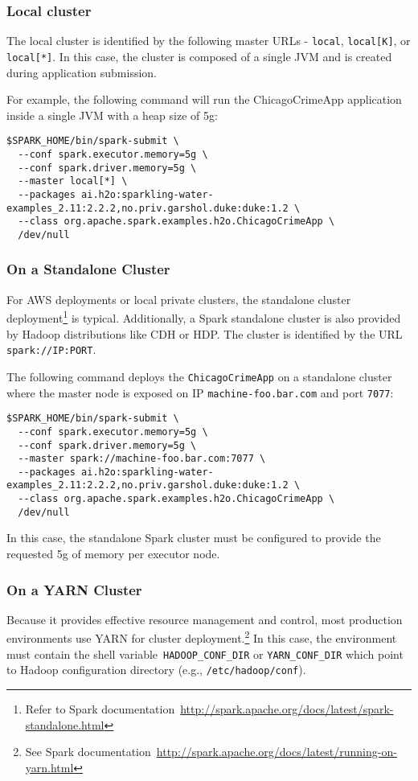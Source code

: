 \subsubsection{Local cluster}
The local cluster is identified by the following master URLs - \texttt{local}, \texttt{local[K]}, or \texttt{local[*]}. In this case, the cluster is composed of a single JVM and is created during application submission.

For example, the following command will run the ChicagoCrimeApp application inside a single JVM with a heap size of 5g:
\begin{lstlisting}[style=Bash]
$SPARK_HOME/bin/spark-submit \ 
  --conf spark.executor.memory=5g \
  --conf spark.driver.memory=5g \
  --master local[*] \
  --packages ai.h2o:sparkling-water-examples_2.11:2.2.2,no.priv.garshol.duke:duke:1.2 \
  --class org.apache.spark.examples.h2o.ChicagoCrimeApp \
  /dev/null
\end{lstlisting}

\subsubsection{On a Standalone Cluster}
For AWS deployments or local private clusters, the standalone cluster deployment\footnote{Refer to Spark documentation~\url{http://spark.apache.org/docs/latest/spark-standalone.html}} is typical. Additionally, a Spark standalone cluster is also provided by Hadoop distributions like CDH or HDP. The cluster is identified by the URL \texttt{spark://IP:PORT}.

The following command deploys the \texttt{ChicagoCrimeApp} on a standalone cluster where the master node is exposed on IP \texttt{machine-foo.bar.com} and port \texttt{7077}:

\begin{lstlisting}[style=Bash]
$SPARK_HOME/bin/spark-submit \ 
  --conf spark.executor.memory=5g \
  --conf spark.driver.memory=5g \
  --master spark://machine-foo.bar.com:7077 \
  --packages ai.h2o:sparkling-water-examples_2.11:2.2.2,no.priv.garshol.duke:duke:1.2 \
  --class org.apache.spark.examples.h2o.ChicagoCrimeApp \
  /dev/null
\end{lstlisting}

In this case, the standalone Spark cluster must be configured to provide the requested 5g of memory per executor node. 

\subsubsection{On a YARN Cluster}
Because it provides effective resource management and control, most production environments use YARN for cluster deployment.\footnote{See Spark documentation~\url{http://spark.apache.org/docs/latest/running-on-yarn.html}} 
In this case, the environment must contain the shell variable~\texttt{HADOOP\_CONF\_DIR} or \texttt{YARN\_CONF\_DIR} which point to Hadoop configuration directory (e.g., \texttt{/etc/hadoop/conf}).

